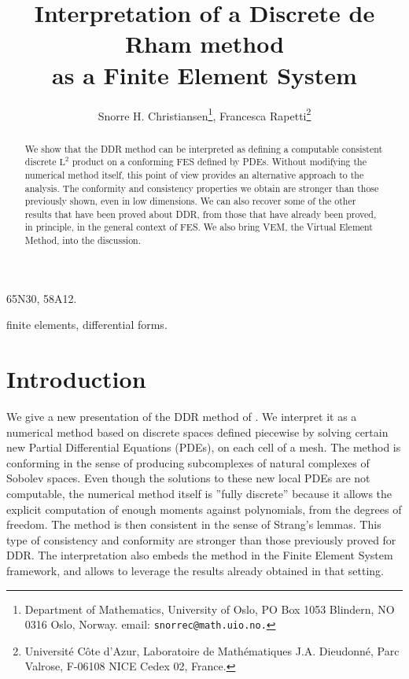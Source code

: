 \documentclass[10pt,a4paper]{article}
\title{Interpretation of a Discrete de Rham method %
  \\ as a Finite Element System}
\author{Snorre H. Christiansen\thanks{Department of Mathematics, University of Oslo, PO Box 1053 Blindern, NO 0316 Oslo, Norway. email: {\tt snorrec@math.uio.no.}}, Francesca Rapetti\thanks{Université Côte d'Azur, Laboratoire de Mathématiques J.A. Dieudonné, Parc Valrose, F-06108 NICE Cedex 02, France.}}
\date{}
\newcommand{\rmL}{\mathrm{L}}
\theoremstyle{remark}
\theoremstyle{definition}
\numberwithin{equation}{section}
\begin{document}
\maketitle

\begin{abstract}
  We show that the DDR method can be interpreted as defining a computable consistent discrete $\rmL^2$ product on a conforming FES defined by PDEs.  Without modifying the numerical method itself, this point of view provides an alternative approach to the analysis. The conformity and consistency properties we obtain are stronger than those previously shown, even in low dimensions. We can also recover some of the other results that have been proved about DDR, from those that have already been proved, in principle, in the general context of FES. We also bring VEM, the Virtual Element Method, into the discussion.
\end{abstract}

\bigskip

 65N30, 58A12.

\bigskip

 finite elements, differential forms.

\bigskip

\section*{Introduction}
We give a new presentation of the DDR method of \cite{DiPDroRap20, DiPDro23, BonDiPDroHu25}. We interpret it as a numerical method based on discrete spaces defined piecewise by solving certain new Partial Differential Equations (PDEs), on each cell of a mesh. The method is conforming in the sense of producing subcomplexes of natural complexes of Sobolev spaces. Even though the solutions to these new local PDEs are not computable, the numerical method itself is ''fully discrete'' because it allows the explicit computation of enough moments against polynomials, from the degrees of freedom. The method is then consistent in the sense of Strang's lemmas.  This type of consistency and conformity are stronger than those previously proved for DDR. The interpretation also embeds the method in the Finite Element System framework, and allows to leverage the results already obtained in that setting. 
\end{document}
